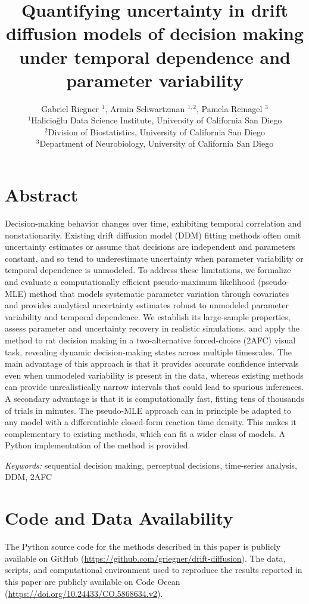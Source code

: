 \documentclass[12pt]{article}
\title{\Large Quantifying uncertainty in drift diffusion models of decision making under temporal dependence and parameter variability}
\author{Gabriel Riegner $^{1}$, Armin Schwartzman $^{1,2}$, Pamela Reinagel $^{3}$\\
{\small $^{1}$Halicio\u{g}lu Data Science Institute, University of California San Diego}\\
{\small $^{2}$Division of Biostatistics, University of California San Diego}\\
{\small $^{3}$Department of Neurobiology, University of California San Diego}\\
}
\date{}
\begin{document}
\maketitle

\section*{Abstract}

Decision-making behavior changes over time, exhibiting temporal correlation and nonstationarity. Existing drift diffusion model (DDM) fitting methods often omit uncertainty estimates or assume that decisions are independent and parameters constant, and so tend to underestimate uncertainty when parameter variability or temporal dependence is unmodeled. To address these limitations, we formalize and evaluate a computationally efficient pseudo-maximum likelihood (pseudo-MLE) method that models systematic parameter variation through covariates and provides analytical uncertainty estimates robust to unmodeled parameter variability and temporal dependence. We establish its large-sample properties, assess parameter and uncertainty recovery in realistic simulations, and apply the method to rat decision making in a two-alternative forced-choice (2AFC) visual task, revealing dynamic decision-making states across multiple timescales. The main advantage of this approach is that it provides accurate confidence intervals even when unmodeled variability is present in the data, whereas existing methods can provide unrealistically narrow intervals that could lead to spurious inferences. A secondary advantage is that it is computationally fast, fitting tens of thousands of trials in minutes. The pseudo-MLE approach can in principle be adapted to any model with a differentiable closed-form reaction time density. This makes it complementary to existing methods, which can fit a wider class of models. A Python implementation of the method is provided.

\vfill
\noindent\textit{Keywords:} sequential decision making, perceptual decisions, time-series analysis, DDM, 2AFC
\thispagestyle{empty}
\newpage
\setcounter{page}{1}











\section{Code and Data Availability}
The Python source code for the methods described in this paper is publicly available on GitHub (\href{https://github.com/griegner/drift-diffusion}{https://github.com/griegner/drift-diffusion}). The data, scripts, and computational environment used to reproduce the results reported in this paper are publicly available on Code Ocean (\href{https://doi.org/10.24433/CO.5868634.v1}{https://doi.org/10.24433/CO.5868634.v2}).
\end{document}
